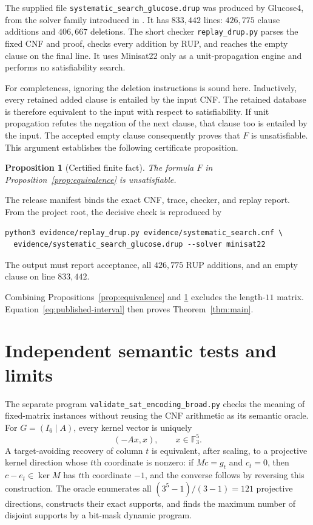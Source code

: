 \documentclass[11pt]{article}
\newtheorem{proposition}[theorem]{Proposition}
\newcommand{\F}{\mathbb F}
\begin{document}
The supplied file \texttt{systematic\_search\_glucose.drup} was produced
by Glucose4, from the solver family introduced in
\cite{AudemardSimon2009}.  It has $833{,}442$ lines: $426{,}775$ clause
additions and $406{,}667$ deletions.  The short checker
\texttt{replay\_drup.py} parses the fixed CNF and proof, checks every
addition by RUP, and reaches the empty clause on the final line.  It
uses Minisat22 only as a unit-propagation engine and performs no
satisfiability search.

For completeness, ignoring the deletion instructions is sound here.
Inductively, every retained added clause is entailed by the input CNF.
The retained database is therefore equivalent to the input with respect
to satisfiability.  If unit propagation refutes the negation of the next
clause, that clause too is entailed by the input.  The accepted empty
clause consequently proves that $F$ is unsatisfiable.  This argument
establishes the following certificate proposition.

\begin{proposition}[Certified finite fact]\label{prop:unsat}
The formula $F$ in Proposition~\ref{prop:equivalence} is unsatisfiable.
\end{proposition}

The release manifest binds the exact CNF, trace, checker, and replay
report.  From the project root, the decisive check is reproduced by
\begin{verbatim}
python3 evidence/replay_drup.py evidence/systematic_search.cnf \
  evidence/systematic_search_glucose.drup --solver minisat22
\end{verbatim}
The output must report acceptance, all $426{,}775$ RUP additions, and an
empty clause on line $833{,}442$.

Combining Propositions~\ref{prop:equivalence} and \ref{prop:unsat}
excludes the length-$11$ matrix.  Equation~\eqref{eq:published-interval}
then proves Theorem~\ref{thm:main}.

\section{Independent semantic tests and limits}

The separate program \texttt{validate\_sat\_encoding\_broad.py} checks
the meaning of fixed-matrix instances without reusing the CNF arithmetic
as its semantic oracle.  For $G=(I_6\mid A)$, every kernel vector is
uniquely
\[
  (-Ax,x),\qquad x\in\F_3^5.
\]
A target-avoiding recovery of column $t$ is equivalent, after scaling,
to a projective kernel direction whose $t$th coordinate is nonzero:
if $Mc=g_t$ and $c_t=0$, then $c-e_t\in\ker M$ has $t$th coordinate
$-1$, and the converse follows by reversing this construction.
The oracle enumerates all
$(3^5-1)/(3-1)=121$ projective directions, constructs their exact
supports, and finds the maximum number of disjoint supports by a
bit-mask dynamic program.
\end{document}
